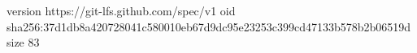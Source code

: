 version https://git-lfs.github.com/spec/v1
oid sha256:37d1db8a420728041c580010eb67d9dc95e23253c399cd47133b578b2b06519d
size 83
